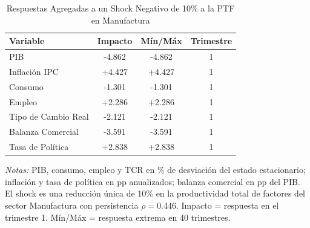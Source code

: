 \begin{table}[htbp]
\centering
\caption{Respuestas Agregadas a un Shock Negativo de 10\% a la PTF en Manufactura}
\label{tab:mfg_agg}
\begin{threeparttable}
\begin{tabular}{@{}l c c c@{}}
\toprule
Variable & Impacto & Mín/Máx & Trimestre \\
\midrule
PIB & -4.862 & -4.862 & 1 \\
Inflación IPC & +4.427 & +4.427 & 1 \\
Consumo & -1.301 & -1.301 & 1 \\
Empleo & +2.286 & +2.286 & 1 \\
Tipo de Cambio Real & -2.121 & -2.121 & 1 \\
Balanza Comercial & -3.591 & -3.591 & 1 \\
Tasa de Política & +2.838 & +2.838 & 1 \\
\bottomrule
\end{tabular}
\begin{tablenotes}[flushleft]
\footnotesize
\item \textit{Notas:} PIB, consumo, empleo y TCR en \% de desviación del estado estacionario; inflación y tasa de política en pp anualizados; balanza comercial en pp del PIB. El shock es una reducción única de 10\% en la productividad total de factores del sector Manufactura con persistencia $\rho = 0.446$. Impacto = respuesta en el trimestre 1. Mín/Máx = respuesta extrema en 40 trimestres.
\end{tablenotes}
\end{threeparttable}
\end{table}
